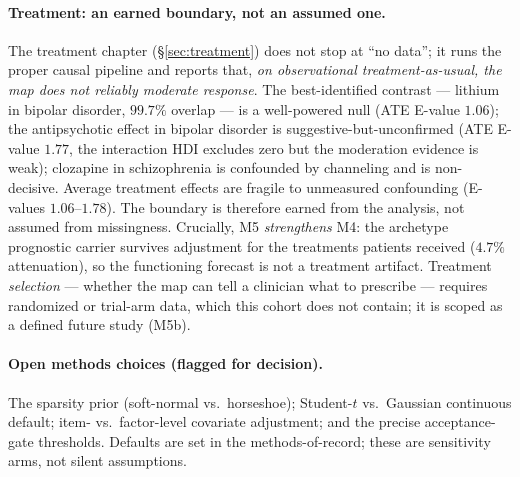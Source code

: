 \paragraph{Treatment: an earned boundary, not an assumed one.} The treatment chapter
(\S\ref{sec:treatment}) does not stop at ``no data''; it runs the proper causal pipeline and reports that,
\emph{on observational treatment-as-usual, the map does not reliably moderate response}. The best-identified
contrast --- lithium in bipolar disorder, $99.7\%$ overlap --- is a well-powered null (ATE E-value
$1.06$); the antipsychotic effect in bipolar disorder is suggestive-but-unconfirmed (ATE E-value $1.77$, the
interaction HDI excludes zero but the moderation evidence is weak); clozapine in schizophrenia is confounded
by channeling and is non-decisive. Average treatment effects are fragile to unmeasured confounding
(E-values $1.06$--$1.78$). The boundary is therefore earned from the analysis, not assumed from missingness.
Crucially, M5 \emph{strengthens} M4: the archetype prognostic carrier survives adjustment for the treatments
patients received ($4.7\%$ attenuation), so the functioning forecast is not a treatment artifact. Treatment
\emph{selection} --- whether the map can tell a clinician what to prescribe --- requires randomized or
trial-arm data, which this cohort does not contain; it is scoped as a defined future study (M5b).

\paragraph{Open methods choices (flagged for decision).} The sparsity prior (soft-normal vs.\ horseshoe);
Student-$t$ vs.\ Gaussian continuous default; item- vs.\ factor-level covariate adjustment; and the precise
acceptance-gate thresholds. Defaults are set in the methods-of-record; these are sensitivity arms, not
silent assumptions.

